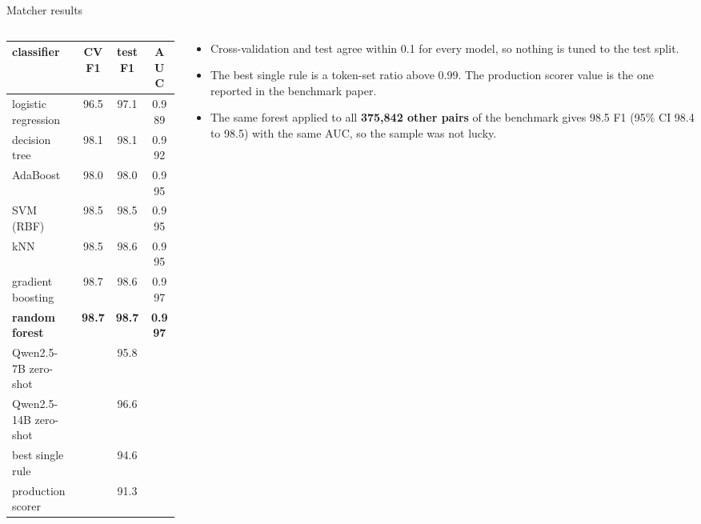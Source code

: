 \documentclass[aspectratio=169,10pt]{beamer}
\newcommand{\hi}[1]{\textcolor{accent2}{\textbf{#1}}}
\begin{document}
\begin{frame}{Matcher results}
\begin{columns}[T]
\begin{column}{0.47\textwidth}
\footnotesize
\begin{tabular}{@{}lccc@{}}
\toprule
classifier & CV F1 & test F1 & AUC\\
\midrule
logistic regression & 96.5 & 97.1 & 0.989\\
decision tree & 98.1 & 98.1 & 0.992\\
AdaBoost & 98.0 & 98.0 & 0.995\\
SVM (RBF) & 98.5 & 98.5 & 0.995\\
kNN & 98.5 & 98.6 & 0.995\\
gradient boosting & 98.7 & 98.6 & 0.997\\
\textbf{random forest} & \textbf{98.7} & \hi{98.7} & \textbf{0.997}\\
\midrule
Qwen2.5-7B zero-shot & & 95.8 & \\
Qwen2.5-14B zero-shot & & 96.6 & \\
best single rule & & 94.6 & \\
production scorer & & 91.3 & \\
\bottomrule
\end{tabular}
\end{column}
\begin{column}{0.51\textwidth}
\begin{itemize}
\item Cross-validation and test agree within 0.1 for every model, so nothing is tuned to the test split.
\item The best single rule is a token-set ratio above 0.99. The production scorer value is the one reported in the benchmark paper.
\item The same forest applied to all \hi{375{,}842 other pairs} of the benchmark gives 98.5 F1 (95\% CI 98.4 to 98.5) with the same AUC, so the sample was not lucky.
\end{itemize}
\end{column}
\end{columns}
\end{frame}
\end{document}
